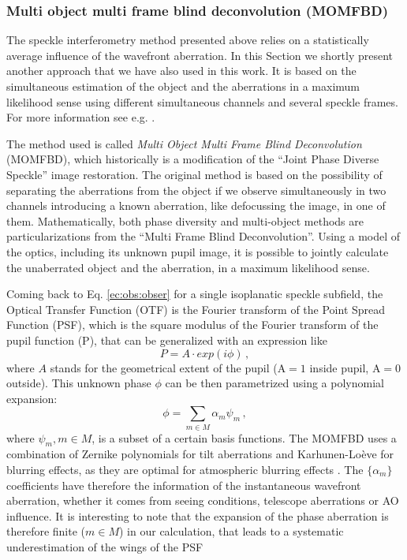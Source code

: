 \subsubsection[Multi object multi frame blind deconvolution]{Multi object multi frame blind deconvolution (MOMFBD)\label{momfbd}}
The speckle interferometry method presented above relies on a statistically average influence of the wavefront aberration. In this Section we shortly present another approach that we have also used in this work. It is based on the simultaneous estimation of the object and the aberrations in a maximum likelihood sense using different simultaneous channels and several speckle frames. For more information see e.g. \citep{Lofdahl:2002qy,2005SoPh..228..191V,2007msfa.conf..119L}.

The method used is called \emph{Multi Object Multi Frame Blind Deconvolution} (MOMFBD), which historically is a modification of the ``Joint Phase Diverse Speckle'' image restoration. The original method is based on the possibility of separating the aberrations from the object if we observe simultaneously in two channels introducing a known aberration, like defocussing the image, in one of them. Mathematically, both phase diversity and multi-object methods are particularizations from the ``Multi Frame Blind Deconvolution''. Using a model of the optics, including its unknown pupil image, it is possible to jointly calculate the unaberrated object and the aberration, in a maximum likelihood sense.

Coming back to Eq. \ref{ec:obs:obser} for a single isoplanatic speckle subfield,  the Optical Transfer Function (OTF) is the Fourier transform of the Point Spread Function (PSF), which is the square modulus of the Fourier transform of the pupil function (P), that can be generalized with an expression like
\begin{equation}
P= A\cdot exp(i\phi) \, ,
\label{ec:momfbd:pupil}
\end{equation}
where $A$ stands for the geometrical extent of the pupil (A$=1$ inside pupil, A$=0$ outside). This unknown phase  $\phi$ can be then parametrized using a polynomial expansion:
\begin{equation}
\phi = \sum_{m\in M} \alpha_{m} \psi_{m} \, ,
\label{eq:momfdb:expan}
\end{equation}
where $\psi_{m},m \in M$, is a subset of a certain basis functions. The MOMFBD uses a combination of Zernike polynomials \citep{1976JOSA...66..207N} for tilt aberrations and Karhunen-Lo\`eve for blurring effects, as they are optimal for atmospheric blurring effects \citep{1990SPIE.1237..668R} . The $\{\alpha_{m} \}$ coefficients have therefore the information of the instantaneous wavefront aberration, whether it comes from seeing conditions, telescope aberrations or AO influence. It is interesting to note that the expansion of the phase aberration is therefore finite ($m \in M$) in our calculation, that leads to a systematic underestimation of the wings of the PSF 
\citep{2005SoPh..228..191V}

